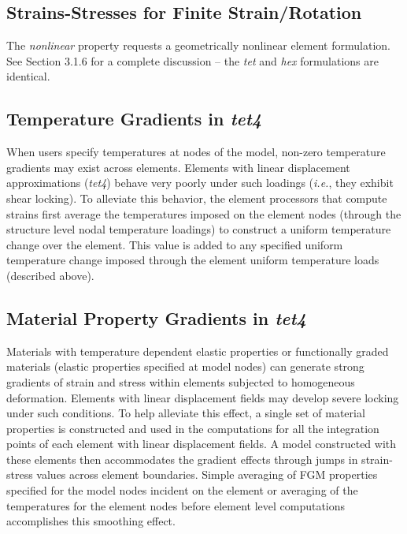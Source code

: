 \documentclass[11pt]{report}
\numberwithin{equation}{section}
\newcommand{\ti}{\emph}
\newcommand{\ie}{\emph{i.e.},\xspace}
\newcommand{\noi}{\noindent}
\newcommand{\tfour}{\ti{tet4}\xspace}
\begin{document}
\subsection {Strains-Stresses for Finite Strain/Rotation}

The \ti{nonlinear} property requests a geometrically nonlinear element formulation. 
See Section 3.1.6 for a complete discussion -- the \ti{tet} 
and \ti{hex} formulations are identical.

\subsection {Temperature Gradients in \tfour}

When users specify temperatures at nodes of the model, non-zero temperature
gradients may exist across elements. Elements with linear displacement
approximations (\tfour) behave very poorly under such loadings (\ie they exhibit
shear locking). To alleviate this behavior, the element processors that compute
strains first average the temperatures imposed on the element nodes (through the
structure level nodal temperature loadings) to construct a uniform temperature
change over the element. This value is added to any specified uniform
temperature change imposed through the element uniform temperature loads
(described above). 


\subsection {Material Property Gradients in \tfour}

\noi Materials with temperature dependent elastic properties or functionally graded
materials (elastic properties specified at model nodes) can generate strong
gradients of strain and stress within elements subjected to homogeneous
deformation. Elements with linear displacement fields may develop severe locking
under such conditions. To help alleviate this effect, a single set of material
properties is constructed and used in the computations for all the integration
points of each element with linear displacement fields. A model constructed with
these elements then accommodates the gradient effects through jumps in
strain-stress values across element boundaries. Simple averaging of FGM
properties specified for the model nodes incident on the element or averaging of
the temperatures for the element nodes before element level computations
accomplishes this smoothing effect.
\end{document}
